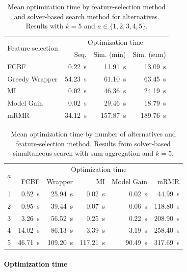 \documentclass{article}
\theoremstyle{definition}
\begin{document}
\begin{table}[t]
	\centering
	\begin{tabular}{lrrr}
		\toprule
		\multirow{2}{*}{Feature selection} & \multicolumn{3}{c}{Optimization time} \\
		\cmidrule(r){2-4}
		& Seq. & Sim. (min) & Sim. (sum) \\
		\midrule
		FCBF & 0.22~s & 11.91~s & 13.09~s \\
		Greedy Wrapper & 54.23~s & 61.10~s & 63.45~s \\
		MI & 0.02~s & 46.36~s & 24.19~s \\
		Model Gain & 0.02~s & 29.46~s & 18.79~s \\
		mRMR & 34.12~s & 157.87~s & 189.76~s \\
		\bottomrule
	\end{tabular}
	\caption{
		Mean optimization time by feature-selection method and solver-based search method for alternatives.
		Results with $k=5$ and $a \in \{1,2,3,4,5\}$.
	}
	\label{tab:afs:impact-search-fs-method-optimization-time}
\end{table}

\begin{table}[t]
	\centering
	\begin{tabular}{lrrrrr}
		\toprule
		\multirow{2}{*}{$a$} & \multicolumn{5}{c}{Optimization time} \\
		\cmidrule(r){2-6}
		& FCBF & Wrapper & MI & Model Gain & mRMR \\
		\midrule
		1 & 0.52~s & 25.94~s & 0.02~s & 0.02~s & 44.99~s \\
		2 & 0.95~s & 39.44~s & 0.07~s & 0.06~s & 118.80~s \\
		3 & 3.26~s & 56.52~s & 0.25~s & 0.22~s & 208.90~s \\
		4 & 14.02~s & 86.13~s & 3.39~s & 3.19~s & 258.40~s \\
		5 & 46.71~s & 109.20~s & 117.21~s & 90.49~s & 317.69~s \\
		\bottomrule
	\end{tabular}
	\caption{
		Mean optimization time by number of alternatives and feature-selection method.
		Results from solver-based simultaneous search with sum-aggregation and $k=5$.
	}
	\label{tab:afs:impact-num-alternatives-fs-method-optimization-time}
\end{table}

\paragraph{Optimization time}
\end{document}
